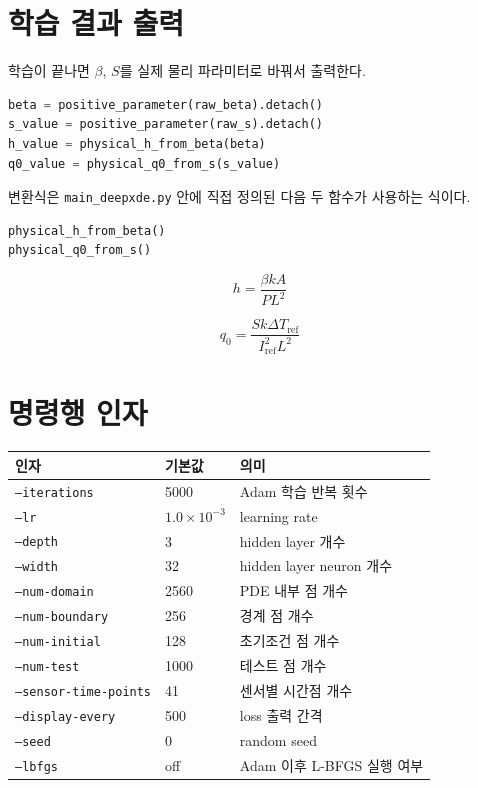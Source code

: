 \documentclass[11pt]{article}
\begin{document}
\section{학습 결과 출력}

학습이 끝나면 \(\beta\), \(S\)를 실제 물리 파라미터로 바꿔서 출력한다.

\begin{lstlisting}[language=Python]
beta = positive_parameter(raw_beta).detach()
s_value = positive_parameter(raw_s).detach()
h_value = physical_h_from_beta(beta)
q0_value = physical_q0_from_s(s_value)
\end{lstlisting}

변환식은 \texttt{main\_deepxde.py} 안에 직접 정의된 다음 두 함수가 사용하는 식이다.

\begin{lstlisting}[language=Python]
physical_h_from_beta()
physical_q0_from_s()
\end{lstlisting}

\[
h =
\frac{\beta kA}{PL^2}
\]

\[
q_0 =
\frac{S k\Delta T_{\mathrm{ref}}}{I_{\mathrm{ref}}^2L^2}
\]

\section{명령행 인자}

\begin{center}
\begin{tabular}{lll}
\toprule
인자 & 기본값 & 의미 \\
\midrule
\texttt{--iterations} & 5000 & Adam 학습 반복 횟수 \\
\texttt{--lr} & \(1.0\times10^{-3}\) & learning rate \\
\texttt{--depth} & 3 & hidden layer 개수 \\
\texttt{--width} & 32 & hidden layer neuron 개수 \\
\texttt{--num-domain} & 2560 & PDE 내부 점 개수 \\
\texttt{--num-boundary} & 256 & 경계 점 개수 \\
\texttt{--num-initial} & 128 & 초기조건 점 개수 \\
\texttt{--num-test} & 1000 & 테스트 점 개수 \\
\texttt{--sensor-time-points} & 41 & 센서별 시간점 개수 \\
\texttt{--display-every} & 500 & loss 출력 간격 \\
\texttt{--seed} & 0 & random seed \\
\texttt{--lbfgs} & off & Adam 이후 L-BFGS 실행 여부 \\
\bottomrule
\end{tabular}
\end{center}
\end{document}
